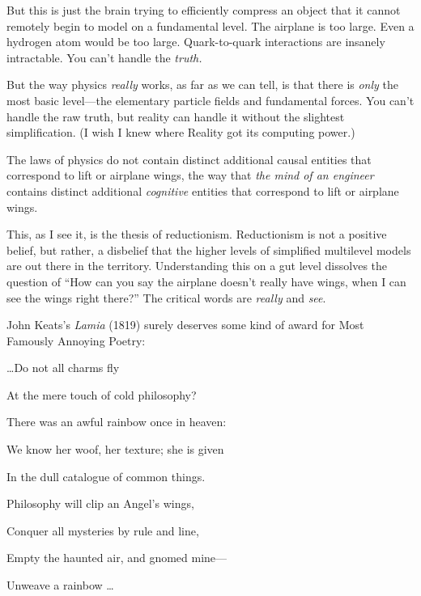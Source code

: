{
 But this is just the brain trying to efficiently compress an
object that it cannot remotely begin to model on a fundamental level.
The airplane is too large. Even a hydrogen atom would be too large.
Quark-to-quark interactions are insanely intractable. You
can't handle the \textit{truth.}}

{
 But the way physics \textit{really} works, as far as we can tell,
is that there is \textit{only} the most basic level---the elementary
particle fields and fundamental forces. You can't
handle the raw truth, but reality can handle it without the slightest
simplification. (I wish I knew where Reality got its computing power.)}

{
 The laws of physics do not contain distinct additional causal
entities that correspond to lift or airplane wings, the way that
\textit{the mind of an engineer} contains distinct additional
\textit{cognitive} entities that correspond to lift or airplane wings.}

{
 This, as I see it, is the thesis of reductionism. Reductionism is
not a positive belief, but rather, a disbelief that the higher levels
of simplified multilevel models are out there in the territory.
Understanding this on a gut level dissolves the question of
``How can you say the airplane doesn't
really have wings, when I can see the wings right
there?'' The critical words are \textit{really} and
\textit{see}.}

\myendsectiontext


{
 John Keats's \textit{Lamia}
(1819) surely deserves some kind of award for Most
Famously Annoying Poetry:}

{
 \ldots Do not all charms fly}

{
 At the mere touch of cold philosophy?}

{
 There was an awful rainbow once in heaven:}

{
 We know her woof, her texture; she is given}

{
 In the dull catalogue of common things.}

{
 Philosophy will clip an Angel's wings,}

{
 Conquer all mysteries by rule and line,}

{
 Empty the haunted air, and gnomed mine---}

{
 Unweave a rainbow \ldots}

